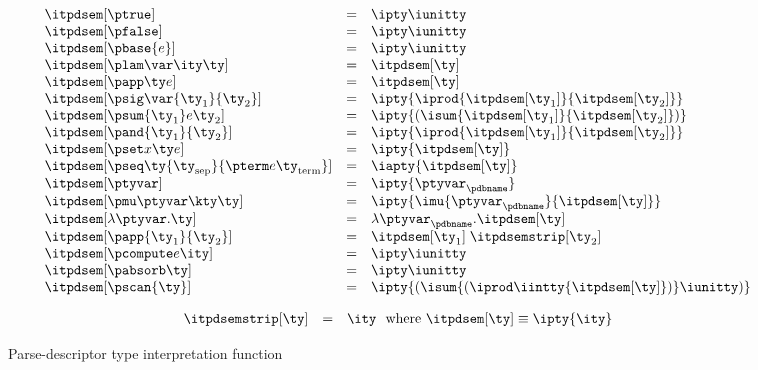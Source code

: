 \begin{figure}
\fbox{$\itpdsem[\ty] = \ity$}
\[ 
\begin{array}{lcl} 
\itpdsem[\ptrue] & = & \ipty \iunitty \\                                                  
\itpdsem[\pfalse] & = & \ipty \iunitty \\                                                  
\itpdsem[\pbase{e}] & = & \ipty \iunitty\\
\itpdsem[\plam \var \ity \ty] & = & \itpdsem[\ty] \\
\itpdsem[\papp \ty e] & = & \itpdsem[\ty] \\
\itpdsem[\psig \var {\ty_1} {\ty_2}] & = & 
               \ipty {\iprod {\itpdsem[\ty_1]} {\itpdsem[\ty_2]}} \\
\itpdsem[\psum {\ty_1} e {\ty_2}] & = & 
               \ipty {(\isum {\itpdsem[\ty_1]} {\itpdsem[\ty_2]})} \\
\itpdsem[\pand {\ty_1} {\ty_2}] & = & \ipty {\iprod {\itpdsem[\ty_1]} {\itpdsem[\ty_2]}}    \\
\itpdsem[\pset x \ty e] & = & \ipty {\itpdsem[\ty]} \\
\itpdsem[\pseq \ty {\ty_{\text{sep}}} {\pterm e {\ty_{\text{term}}}}] & = & 
  \iapty {\itpdsem[\ty]} \\
\itpdsem[\ptyvar] & = & \ipty{\ptyvar_\pdbname} \\
\itpdsem[\pmu \ptyvar \kty \ty] & = & 
  \ipty{\imu{\ptyvar_\pdbname}{\itpdsem[\ty]}} \\
\itpdsem[\lambda \ptyvar.\ty]      
     & = & \lambda \ptyvar_\pdbname.\itpdsem[\ty] \\
\itpdsem[\papp {\ty_1} {\ty_2}]            & = & \itpdsem[\ty_1] \; \itpdsemstrip[\ty_2] \\
\itpdsem[\pcompute e \ity]            & = & \ipty \iunitty \\
\itpdsem[\pabsorb \ty]                & = & \ipty \iunitty \\
\itpdsem[\pscan{\ty}] & = & \ipty {(\isum {(\iprod \iintty
    {\itpdsem[\ty]})} \iunitty)}
\end{array}
\]
\fbox{$\itpdsemstrip[\ty] = \ity$}

\[
\begin{array}{lcl} 
\itpdsemstrip[\ty] & = & \ity \ \ \mbox{where}\ \itpdsem[\ty] \equiv \ipty{\ity}
\end{array}
\]
\caption{Parse-descriptor type interpretation function}
\label{fig:pd-tys}
\end{figure}

